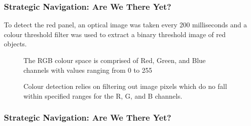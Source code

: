 \documentclass[aspectratio=169]{beamer}
\begin{document}

\begin{frame}
\frametitle{Strategic Navigation: Are We There Yet?}
To detect the red panel, an optical image was taken every 200 milliseconds and a colour threshold filter was used to extract a binary threshold image of red objects.\\
\vspace{0.25cm}
\begin{minipage}{0.45\textwidth}
\begin{figure}
\centering
{}
\caption{The RGB colour space is comprised of Red, Green, and Blue channels with values ranging from 0 to 255}
\end{figure}
\end{minipage}
\hspace{1cm}
\begin{minipage}{0.45\textwidth}
\begin{figure}
\centering
{}
\caption{Colour detection relies on filtering out image pixels which do no fall within specified ranges for the R, G, and B channels.}
\end{figure}
\end{minipage}
\end{frame}


\begin{frame}
\frametitle{Strategic Navigation: Are We There Yet?}
\begin{center}
\end{center}
\end{frame}

\end{document}
